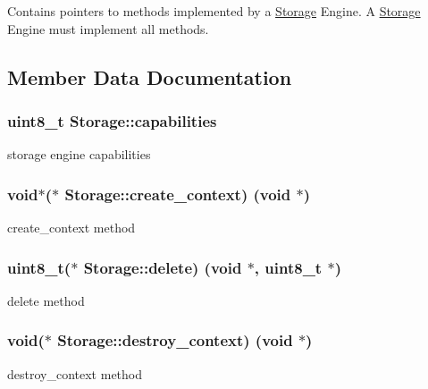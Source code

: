 Contains pointers to methods implemented by a \hyperlink{struct_storage}{Storage} Engine. A \hyperlink{struct_storage}{Storage} Engine must implement all methods. 

\subsection{Member Data Documentation}
\hypertarget{struct_storage_a7b4013010f2549531d066e6d701c69d9}{}
\subsubsection[{capabilities}]{\setlength{\rightskip}{0pt plus 5cm}uint8\+\_\+t Storage\+::capabilities}\label{struct_storage_a7b4013010f2549531d066e6d701c69d9}
storage engine capabilities \hypertarget{struct_storage_a96d6e9b9bfd5b4943eb9660ca2293447}{}
\subsubsection[{create\+\_\+context}]{\setlength{\rightskip}{0pt plus 5cm}void$\ast$($\ast$ Storage\+::create\+\_\+context) (void $\ast$)}\label{struct_storage_a96d6e9b9bfd5b4943eb9660ca2293447}
create\+\_\+context method \hypertarget{struct_storage_a683a58e3ef6da9f3a95fdf4a94f80dc3}{}
\subsubsection[{delete}]{\setlength{\rightskip}{0pt plus 5cm}uint8\+\_\+t($\ast$ Storage\+::delete) (void $\ast$, uint8\+\_\+t $\ast$)}\label{struct_storage_a683a58e3ef6da9f3a95fdf4a94f80dc3}
delete method \hypertarget{struct_storage_af425b1971a9fcfed315e6aec547df8da}{}
\subsubsection[{destroy\+\_\+context}]{\setlength{\rightskip}{0pt plus 5cm}void($\ast$ Storage\+::destroy\+\_\+context) (void $\ast$)}\label{struct_storage_af425b1971a9fcfed315e6aec547df8da}
destroy\+\_\+context method \hypertarget{struct_storage_a8d06a225bc4d31d734cab75608fa3cf3}{}
